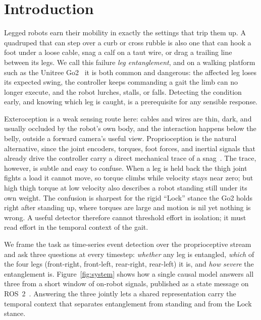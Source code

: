 \section{Introduction}

Legged robots earn their mobility in exactly the settings that trip them up. A quadruped that can step over a curb or cross rubble is also one that can hook a foot under a loose cable, snag a calf on a taut wire, or drag a trailing line between its legs. We call this failure \emph{leg entanglement}, and on a walking platform such as the Unitree Go2~\cite{unitree_go2} it is both common and dangerous: the affected leg loses its expected swing, the controller keeps commanding a gait the limb can no longer execute, and the robot lurches, stalls, or falls. Detecting the condition early, and knowing which leg is caught, is a prerequisite for any sensible response.

Exteroception is a weak sensing route here: cables and wires are thin, dark, and usually occluded by the robot's own body, and the interaction happens below the belly, outside a forward camera's useful view. Proprioception is the natural alternative, since the joint encoders, torques, foot forces, and inertial signals that already drive the controller carry a direct mechanical trace of a snag~\cite{hwangbo2019learning,lee2020learning,camurri2017contact}. The trace, however, is subtle and easy to confuse. When a leg is held back the thigh joint fights a load it cannot move, so torque climbs while velocity stays near zero; but high thigh torque at low velocity also describes a robot standing still under its own weight. The confusion is sharpest for the rigid ``Lock'' stance the Go2 holds right after standing up, where torques are large and motion is nil yet nothing is wrong. A useful detector therefore cannot threshold effort in isolation; it must read effort in the temporal context of the gait.

We frame the task as time-series event detection over the proprioceptive stream and ask three questions at every timestep: \emph{whether} any leg is entangled, \emph{which} of the four legs (front-right, front-left, rear-right, rear-left) it is, and \emph{how severe} the entanglement is. Figure~\ref{fig:system} shows how a single causal model answers all three from a short window of on-robot signals, published as a state message on ROS~2~\cite{macenski2022ros2}. Answering the three jointly lets a shared representation carry the temporal context that separates entanglement from standing and from the Lock stance.

